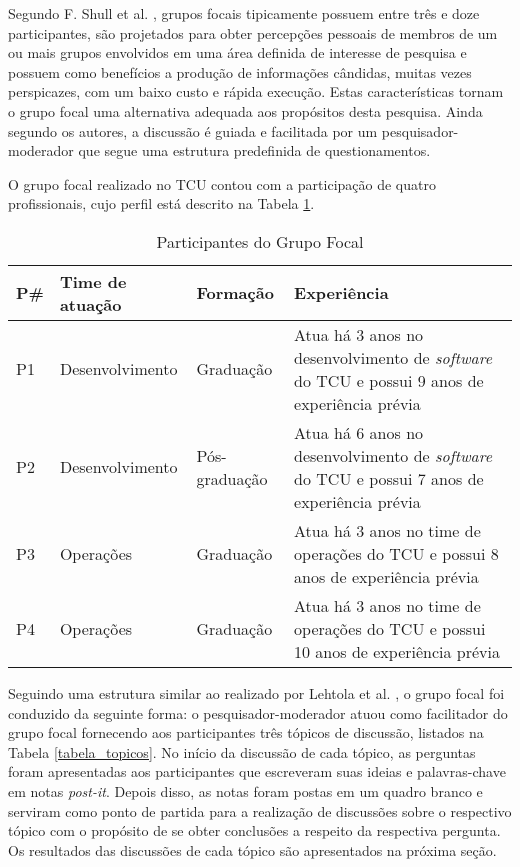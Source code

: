 Segundo F. Shull et al. \cite{shull2007guide}, grupos focais tipicamente
possuem entre três e doze participantes, são projetados para obter percepções
pessoais de membros de um ou mais grupos envolvidos em uma área definida de
interesse de pesquisa e possuem como benefícios a produção de informações
cândidas, muitas vezes perspicazes, com um baixo custo e rápida execução.
Estas características tornam o grupo focal uma alternativa adequada aos
propósitos desta pesquisa. Ainda segundo os autores, a discussão é guiada e
facilitada por um pesquisador-moderador que segue uma estrutura predefinida
de questionamentos.

O grupo focal realizado no \acrshort{TCU} contou com a participação de quatro
profissionais, cujo perfil está descrito na Tabela \ref{tabela_participantes_grupo_focal}.

\begin{table}[hb!]
\centering
\label{tabela_participantes_grupo_focal}
\begin{tabular}{|p{0.7cm}|p{3.5cm}|p{2.8cm}|p{6.5cm}|} \hline
{\bf P\#} & {\bf Time de atuação} & {\bf Formação} & {\bf Experiência}\\ \hline
P1 & Desenvolvimento & Graduação & Atua há 3 anos no desenvolvimento de {\it software} do \acrshort{TCU} e possui 9 anos de experiência prévia \\ \hline
P2 & Desenvolvimento & Pós-graduação & Atua há 6 anos no desenvolvimento de {\it software} do \acrshort{TCU} e possui 7 anos de experiência prévia \\ \hline
P3 & Operações & Graduação & Atua há 3 anos no time de operações do \acrshort{TCU} e possui 8 anos de experiência prévia \\ \hline
P4 & Operações & Graduação & Atua há 3 anos no time de operações do \acrshort{TCU} e possui 10 anos de experiência prévia \\ \hline
\end{tabular}
\caption{Participantes do Grupo Focal}
\end{table}

Seguindo uma estrutura similar ao realizado por Lehtola et al. \cite{requirementes_priorization_in_practice},
o grupo focal foi conduzido da seguinte forma: o pesquisador-moderador atuou
como facilitador do grupo focal fornecendo aos participantes três tópicos de
discussão, listados na Tabela \ref{tabela_topicos}. No início da discussão de
cada tópico, as perguntas foram apresentadas aos participantes que escreveram
suas ideias e palavras-chave em notas {\it post-it}. Depois disso, as notas
foram postas em um quadro branco e serviram como ponto de partida para a
realização de discussões sobre o respectivo tópico com o propósito de se obter
conclusões a respeito da respectiva pergunta. Os resultados das discussões de
cada tópico são apresentados na próxima seção.

